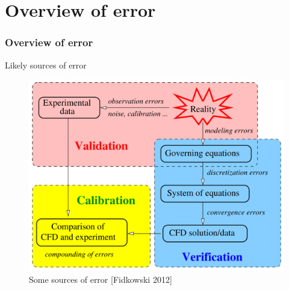 \documentclass{beamer}
\begin{document}


\section[Error]{Overview of error}
\begin{frame}%
\frametitle{Overview of error}
\vspace{-5pt}
\begin{minipage}[t][0.7\textheight]{1\textwidth}
\scriptsize
\vspace{-20pt}
\begin{block}{Likely sources of error}
\vspace{-10pt}
\begin{figure}[h!]
\includegraphics[height=0.47\textwidth]{./figs/Error.png}
\vspace{-5pt}
\caption{Some sources of error [Fidkowski 2012]}
\label{fig:Fidk}
\end{figure}
\vspace{-20pt}
\end{block}
\end{minipage}
\end{frame}
\end{document}
